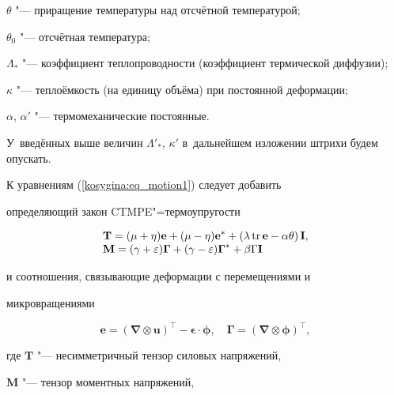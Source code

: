 $\theta$ "--- приращение температуры над отсчётной температурой; 

$\theta_{0}$ "--- отсчётная температура; 

$\Lambda_{*}$ "--- коэффициент теплопроводности (коэффициент термической диффузии);

$\kappa$ "--- теплоёмкость (на единицу объёма) при постоянной деформации; 

$\alpha$, $\alpha'$ "--- термомеханические постоянные. 

У~введённых выше величин $\Lambda'_{*}$, $\kappa' $ в~дальнейшем изложении штрихи будем опускать.



К уравнениям (\ref{kosygina:eq_motion1}) следует добавить

определяющий закон CTMPE"=термоупру\-гости

\begin{equation}\label{kosygina:operator_napr}

\begin{array}{l} 

\displaystyle{ {\mathbf{ T}}=(\mu+\eta) {\mathbf{{e}}}+(\mu-\eta) {\mathbf{{e}}}^*+\left(\lambda \,{\rm tr}\,  {\mathbf{{e}}} -\alpha\theta\right) {\mathbf{{I}}},}\\

\displaystyle{ {\mathbf{ M}}=(\gamma+\varepsilon)

{\mathbf{{\Gamma}}}+(\gamma-\varepsilon)

{\mathbf{{\Gamma}}}^*+\beta\Gamma  {\mathbf{{I}}}}

\end{array}

\end{equation}

и соотношения, связывающие деформации с перемещениями и

микровращениями

$$

 {\mathbf{{e}}}=(\boldsymbol

\nabla\otimes\mathbf{{u}})^{\top}-

{\boldsymbol{{\epsilon}}}\cdot\boldsymbol{\phi},\quad

{\mathbf{{\Gamma}}}=(\boldsymbol

\nabla\otimes\boldsymbol{\phi})^{\top},

$$

где $ {\mathbf{ T}}$ "--- несимметричный тензор силовых напряжений, 

${\mathbf{ M}}$ "--- тензор моментных напряжений, 

